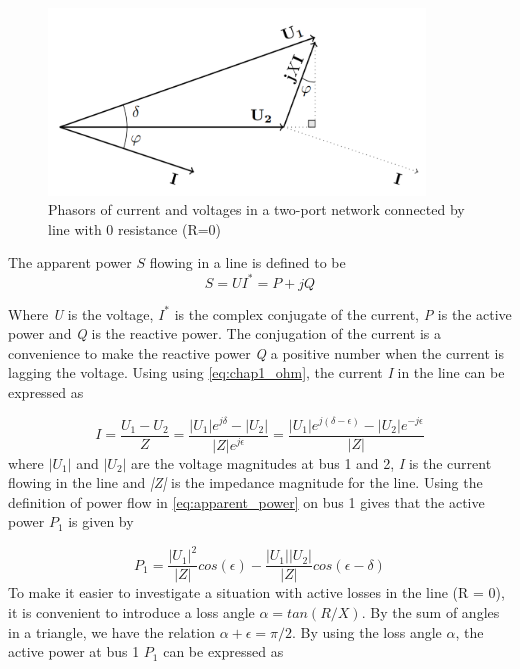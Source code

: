 \documentclass[class=book, crop=false]{standalone}
\begin{document}
\begin{figure}[ht!]
    \center
    \includegraphics[width=10cm]{figures/two_bus_phasor.PNG}
    \caption[size = 9]{Phasors of current and voltages in a two-port network connected by line with 0 resistance (R=0)}
	\label{fig:two_bus_phasor}
\end{figure}

The apparent power $S$ flowing in a line is defined to be
\begin{equation}\label{eq:apparent_power}
    S  = UI^{*} = P + jQ
\end{equation}

Where \textit{U} is the voltage, $I^{*}$ is the complex conjugate of the current, \textit{P} is the active power and \textit{Q} is the reactive power. The conjugation of the current is a convenience to make the reactive power \textit{Q} a positive number when the current is lagging the voltage. Using using \eqref{eq:chap1_ohm}, the current \textit{I} in the line can be expressed as

\begin{equation}\label{eq:two_port_current}
    I  = \frac{U_{1} - U_{2}}{Z}
    = \frac{|U_{1}|e^{j\delta} - |U_{2}|}{|Z|e^{j\epsilon}}
    = \frac{|U_{1}|e^{j(\delta- \epsilon)} - |U_{2}|e^{-j\epsilon}}{|Z|}
\end{equation}
where $|U_{1}|$ and $|U_{2}|$ are the voltage magnitudes at bus 1 and 2, \textit{I} is the current flowing in the line and \textit{|Z|} is the impedance magnitude for the line. Using the definition of power flow in \eqref{eq:apparent_power} on bus 1 gives that the active power $P_{1}$ is given by

\begin{equation}\label{eq:two_port_active_power}
P_{1} = \frac{|U_{1}|^2}{|Z|}cos(\epsilon) - \frac{|U_{1}||U_{2}|}{|Z|}cos(\epsilon - \delta)
\end{equation}
To make it easier to investigate a situation with active losses in the line (R = 0), it is convenient to introduce a loss angle $\alpha = tan(R/X)$. By the sum of angles in a triangle, we have the relation $\alpha + \epsilon = \pi/2$. By using the loss angle $\alpha$, the active power at bus 1 $P_{1}$ can be expressed as
\end{document}
